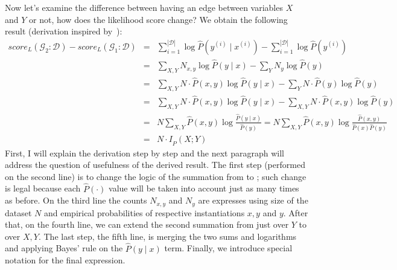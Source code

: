 \documentclass[english,cover]{fitthesis} %
\begin{document}
Now let's examine the difference between having an edge between variables $X$ and $Y$ or not, how does the likelihood score change? We obtain the following result (derivation inspired by~\cite[p.~791]{pgm}):
\begin{eqnarray*}
   score_L(\mathcal{G}_2 : \mathcal{D}) - score_L(\mathcal{G}_1 : \mathcal{D}) 
     & = & \sum_{i=1}^{|\mathcal{D}|} \log \hat P(y^{(i)} \mid x^{(i)}) - \sum_{i=1}^{|\mathcal{D}|} \log \hat P(y^{(i)}) \\
     & = & \sum_{X,Y} N_{x,y} \log \hat P(y \mid x) - \sum_{Y} N_y \log \hat P(y) \\
     & = & \sum_{X,Y} N \cdot \hat P(x,y) \log \hat P(y \mid x) - \sum_{Y} N \cdot \hat P(y) \log \hat P(y) \\
     & = & \sum_{X,Y} N \cdot \hat P(x,y) \log \hat P(y \mid x) - \sum_{X, Y} N \cdot \hat P(x, y) \log \hat P(y) \\
     & = & N \sum_{X,Y} \hat P(x,y) \log \frac{\hat P(y \mid x)}{\hat P(y)}
       =   N \sum_{X,Y} \hat P(x,y) \log \frac{\hat P(x, y)}{\hat P(x) \hat P(y)} \\
     & = & N \cdot I_{\hat P}(X; Y)
\end{eqnarray*}
First, I will explain the derivation step by step and the next paragraph will address the question of usefulness of the derived result. The first step (performed on the second line) is to change the logic of the summation from  to ; such change is legal because each $\hat P(\cdot)$ value will be taken into account just as many times as before.
On the third line the counts $N_{x,y}$ and $N_y$ are expresses using size of the dataset $N$ and empirical probabilities of respective instantiations $x,y$ and $y$.
After that, on the fourth line, we can extend the second summation from just over $Y$ to over $X,Y$.
The last step, the fifth line, is merging the two sums and logarithms and applying Bayes' rule on the $\hat P(y \mid x)$ term. Finally, we introduce special notation for the final expression.
\end{document}

